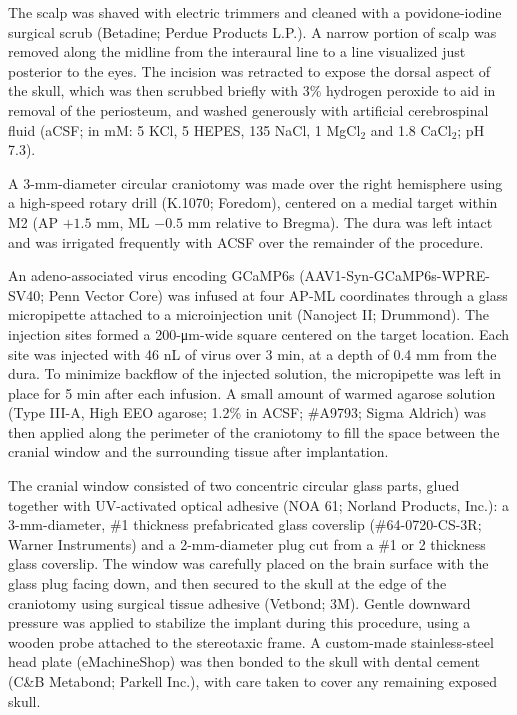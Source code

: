 The scalp was shaved with electric trimmers and cleaned with a povidone-iodine surgical scrub (Betadine; Perdue Products L.P.). A narrow portion of scalp was removed along the midline from the interaural line to a line visualized just posterior to the eyes. The incision was retracted to expose the dorsal aspect of the skull, which was then scrubbed briefly with 3\% hydrogen peroxide to aid in removal of the periosteum, and washed generously with artificial cerebrospinal fluid (aCSF; in mM: 5 KCl, 5 HEPES, 135 NaCl, 1 MgCl$_2$ and 1.8 CaCl$_2$; pH 7.3). 

A 3-mm-diameter circular craniotomy was made over the right hemisphere using a high-speed rotary drill (K.1070; Foredom), centered on a medial target within M2 (AP $+1.5$ mm, ML $-0.5$ mm relative to Bregma). The dura was left intact and was irrigated frequently with ACSF over the remainder of the procedure. 

An adeno-associated virus encoding GCaMP6s (AAV1-Syn-GCaMP6s-WPRE-SV40; Penn Vector Core) was infused at four AP-ML coordinates through a glass micropipette attached to a microinjection unit (Nanoject II; Drummond). The injection sites formed a 200-\si{\um}-wide square centered on the target location. Each site was injected with 46 nL of virus over 3 min, at a depth of 0.4 mm from the dura. To minimize backflow of the injected solution, the micropipette was left in place for 5 min after each infusion. A small amount of warmed agarose solution (Type III-A, High EEO agarose; 1.2\% in ACSF; \#A9793; Sigma Aldrich) was then applied along the perimeter of the craniotomy to fill the space between the cranial window and the surrounding tissue after implantation. 

The cranial window consisted of two concentric circular glass parts, glued together with UV-activated optical adhesive (NOA 61; Norland Products, Inc.): a 3-mm-diameter, \#1 thickness prefabricated glass coverslip (\#64-0720-CS-3R; Warner Instruments) and a 2-mm-diameter plug cut from a \#1 or 2 thickness glass coverslip. The window was carefully placed on the brain surface with the glass plug facing down, and then secured to the skull at the edge of the craniotomy using surgical tissue adhesive (Vetbond; 3M). Gentle downward pressure was applied to stabilize the implant during this procedure, using a wooden probe attached to the stereotaxic frame. A custom-made stainless-steel head plate (eMachineShop) was then bonded to the skull with dental cement (C\&B Metabond; Parkell Inc.), with care taken to cover any remaining exposed skull. 

